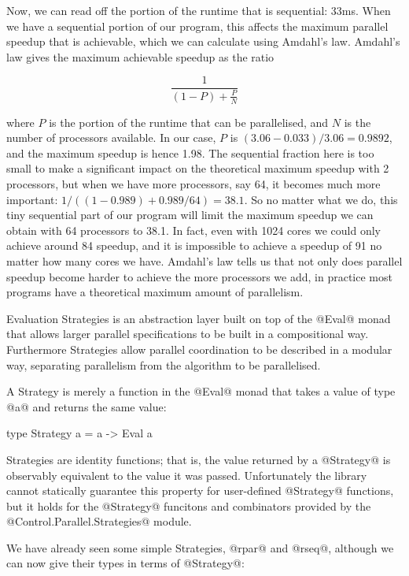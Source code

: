 Now, we can read off the portion of the runtime that is sequential:
33ms.  When we have a sequential portion of our program, this affects
the maximum parallel speedup that is achievable, which we can
calculate using Amdahl's law.  Amdahl's law gives the maximum
achievable speedup as the ratio

\[
  \frac{1}{(1 - P) + \frac{P}{N}}
\]

\noindent where $P$ is the portion of the runtime that can be
parallelised, and $N$ is the number of processors available.  In our
case, $P$ is $(3.06-0.033)/3.06 = 0.9892$, and the maximum speedup is
hence 1.98.  The sequential fraction here is too small to make a
significant impact on the theoretical maximum speedup with 2
processors, but when we have more processors, say 64, it becomes much
more important: $1 / ((1-0.989) + 0.989/64) = 38.1$.  So no matter
what we do, this tiny sequential part of our program will limit the
maximum speedup we can obtain with 64 processors to 38.1.  In fact,
even with 1024 cores we could only achieve around 84 speedup, and it
is impossible to achieve a speedup of 91 no matter how many cores we
have.  Amdahl's law tells us that not only does parallel speedup
become harder to achieve the more processors we add, in practice most
programs have a theoretical maximum amount of parallelism.


Evaluation Strategies \cite{trinder:strategies,seq-no-more} is an abstraction
layer built on top of the @Eval@ monad that allows larger parallel
specifications to be built in a compositional way.  Furthermore
Strategies allow parallel coordination to be described in a modular
way, separating parallelism from the algorithm to be parallelised.

A Strategy is merely a function in the @Eval@ monad that takes a value
of type @a@ and returns the same value:

\begin{haskell}
type Strategy a = a -> Eval a
\end{haskell}

\noindent Strategies are identity functions; that is, the value
returned by a @Strategy@ is observably equivalent to the value it was
passed.  Unfortunately the library cannot statically guarantee this
property for user-defined @Strategy@ functions, but it holds for the
@Strategy@ funcitons and combinators provided by the
@Control.Parallel.Strategies@ module.

We have already seen some simple Strategies, @rpar@ and @rseq@,
although we can now give their types in terms of @Strategy@:

